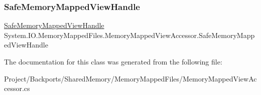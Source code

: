 \subsubsection{\texorpdfstring{Safe\+Memory\+Mapped\+View\+Handle}{SafeMemoryMappedViewHandle}}
{\footnotesize\ttfamily \hyperlink{class_microsoft_1_1_win32_1_1_safe_handles_1_1_safe_memory_mapped_view_handle}{Safe\+Memory\+Mapped\+View\+Handle} System.\+I\+O.\+Memory\+Mapped\+Files.\+Memory\+Mapped\+View\+Accessor.\+Safe\+Memory\+Mapped\+View\+Handle\hspace{0.3cm}{\ttfamily [get]}}







The documentation for this class was generated from the following file\+:\begin{DoxyCompactItemize}
\item 
Project/\+Backports/\+Shared\+Memory/\+Memory\+Mapped\+Files/Memory\+Mapped\+View\+Accessor.\+cs\end{DoxyCompactItemize}
